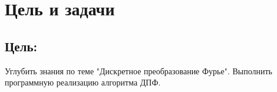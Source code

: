 \chapter*{Цель и задачи}
\label{ch:intro}

\section*{\textbf{Цель:}}

Углубить знания по теме "Дискретное преобразование Фурье". Выполнить программную реализацию алгоритма ДПФ.

\endinput